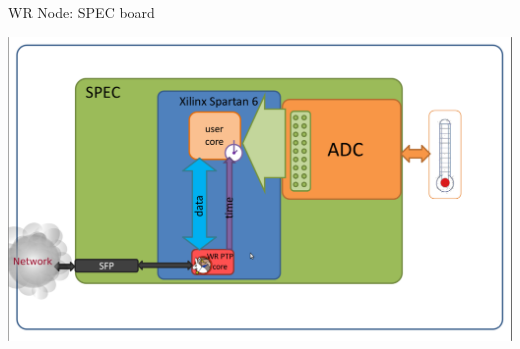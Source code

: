 \documentclass[compress,red]{beamer}
\begin{document}
\begin{frame}{WR Node: SPEC board}

    \begin{center}
    \includegraphics[width=1.0\textwidth]{node/specInterior.pdf}
    \end{center}

\end{frame}
\end{document}
